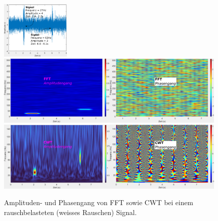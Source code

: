 \begin{figure}
	\centering
	\includegraphics[width=0.3\textwidth]{papers/wavelets/images/18-4_CWTvsFFTSignalNoisy.png}
	\includegraphics[width=\textwidth]{papers/wavelets/images/18-5_FFTnoisy.png}
	\includegraphics[width=\textwidth]{papers/wavelets/images/18-6_CWTnoisy.png}
	\caption{Amplituden- und Phasengang von FFT sowie CWT bei einem rauschbelasteten (weisses Rauschen) Signal.}
	\label{wavelet:fig:FFTnoisy}
\end{figure}
